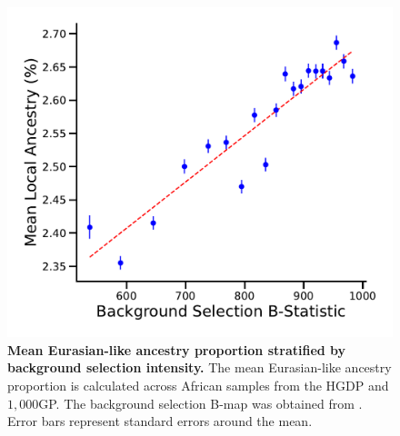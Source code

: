 \begin{figure}
    \centering
    \includegraphics[width=\textwidth]{figures/gb_bta/back_to_africa_corr_with_bmap.pdf}
    \caption{\textbf{Mean Eurasian-like ancestry proportion stratified by background selection intensity.} The mean Eurasian-like ancestry proportion is calculated across African samples from the HGDP and $1{,}000$GP. The background selection B-map was obtained from \cite{murphy2022broad}. Error bars represent standard errors around the mean. }
    \label{fig:gb_bta_background_selection}
\end{figure}

